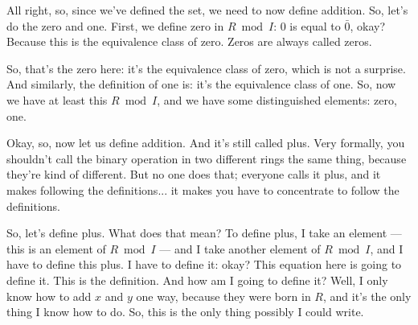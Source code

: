 \begin{speech}[00:37:33 - 00:39:08]
All right, so, since we've defined the set, we need to now define addition. So, let's do the zero and one. First, we define zero in $R \bmod I$:  $0$ is equal to $\bar{0}$, okay? Because this is the equivalence class of zero. Zeros are always called zeros. 

So, that's the zero here: it's the equivalence class of zero, which is not a surprise. And similarly, the definition of one is: it's the equivalence class of one.  So, now we have at least this $R \bmod I$, and we have some distinguished elements: zero, one. 

Okay, so, now let us define addition.  And it's still called plus. Very formally, you shouldn't call the binary operation in two different rings the same thing, because they're kind of different. But no one does that; everyone calls it plus, and it makes following the definitions... it makes you have to concentrate to follow the definitions. 

So, let's define plus. What does that mean? To define plus, I take an element --- this is an element of $R \bmod I$ --- and I take another element of $R \bmod I$, and I have to define this plus. I have to define it:  okay? This equation here is going to define it. This is the definition. And how am I going to define it? Well, I only know how to add $x$ and $y$ one way, because they were born in $R$, and it's the only thing I know how to do. So, this is the only thing possibly I could write.
\end{speech}

\begin{content}

\end{content}

